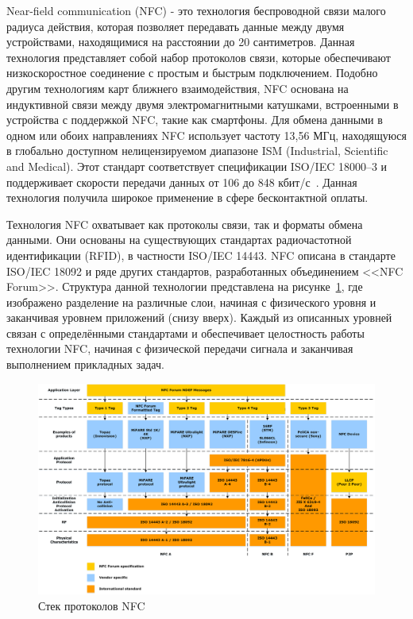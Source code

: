 Near-field communication (NFC) - это технология беспроводной связи малого радиуса действия, которая позволяет передавать данные между двумя устройствами, находящимися на расстоянии до 20 сантиметров.
Данная технология представляет собой набор протоколов связи, которые обеспечивают низкоскоростное соединение с простым и быстрым подключением.
Подобно другим технологиям карт ближнего взаимодействия, NFC основана на индуктивной связи между двумя электромагнитными катушками, встроенными в устройства с поддержкой NFC, такие как смартфоны.
Для обмена данными в одном или обоих направлениях NFC использует частоту 13,56 МГц, находящуюся в глобально доступном нелицензируемом диапазоне ISM (Industrial, Scientific and Medical).
Этот стандарт соответствует спецификации ISO/IEC 18000--3 и поддерживает скорости передачи данных от 106 до 848 кбит/с~\cite{nfc_wiki}.
Данная технология получила широкое применение в сфере бесконтактной оплаты.

Технология NFC охватывает как протоколы связи, так и форматы обмена данными.
Они основаны на существующих стандартах радиочастотной идентификации (RFID), в частности ISO/IEC 14443.
NFC описана в стандарте ISO/IEC 18092 и ряде других стандартов, разработанных объединением <<NFC Forum>>.
Структура данной технологии представлена на рисунке~\ref{fig:nfc_tech}, где изображено разделение на различные слои, начиная с физического уровня и заканчивая уровнем приложений (снизу вверх).
Каждый из описанных уровней связан с определёнными стандартами и обеспечивает целостность работы технологии NFC, начиная с физической передачи сигнала и заканчивая выполнением прикладных задач.

\begin{figure}[H]
    \centering
    \includegraphics[width=1\textwidth]{images/research/nfc_tech}
    \caption{\centering Стек протоколов NFC}
    \label{fig:nfc_tech}
\end{figure}

